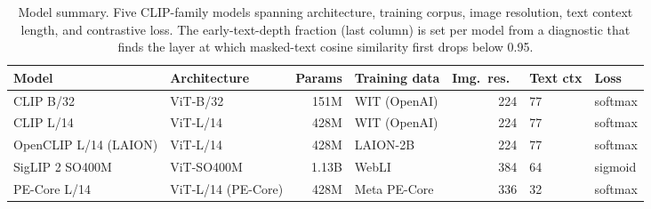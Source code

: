 \begin{table}[h]
\centering
\caption{Model summary. Five CLIP-family models spanning architecture, training corpus, image resolution, text context length, and contrastive loss. The early-text-depth fraction (last column) is set per model from a diagnostic that finds the layer at which masked-text cosine similarity first drops below 0.95.}
\label{tab:t1_models}
\small
\begin{tabular}{llrlrll}
\toprule
Model & Architecture & Params & Training data & Img.\ res.\ & Text ctx & Loss \\
\midrule
CLIP B/32 & ViT-B/32 & 151M & WIT (OpenAI) & 224 & 77 & softmax \\
CLIP L/14 & ViT-L/14 & 428M & WIT (OpenAI) & 224 & 77 & softmax \\
OpenCLIP L/14 (LAION) & ViT-L/14 & 428M & LAION-2B & 224 & 77 & softmax \\
SigLIP 2 SO400M & ViT-SO400M & 1.13B & WebLI & 384 & 64 & sigmoid \\
PE-Core L/14 & ViT-L/14 (PE-Core) & 428M & Meta PE-Core & 336 & 32 & softmax \\
\bottomrule
\end{tabular}
\end{table}